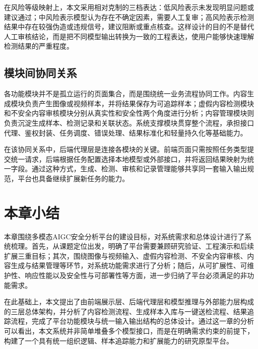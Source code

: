 在风险等级映射上，本文采用相对克制的三档表达：低风险表示未发现明显问题或建议通过；中风险表示模型认为存在不确定因素，需要人工复审；高风险表示检测结果中存在较强伪造或违规信号，建议阻断或重点核查。这样设计的目的不是替代人工审核结论，而是把不同模型输出转换为一致的工程表达，使用户能够快速理解检测结果的严重程度。

\subsection{模块间协同关系}

各功能模块并不是孤立运行的页面集合，而是围绕统一业务流程协同工作。内容生成模块负责产生图像或视频样本，并将结果保存为可追踪样本；虚假内容检测模块和不安全内容审核模块分别从真实性和安全性两个角度进行分析；内容管理模块则负责沉淀生成样本、检测记录和关联状态。系统支撑模块贯穿整个流程，承担接口代理、鉴权封装、任务调度、错误处理、结果标准化和轻量持久化等基础能力。

在该协同关系中，后端代理层是连接各模块的关键。前端页面只需按照任务类型提交统一请求，后端根据任务配置选择本地模型或外部接口，并将返回结果映射为统一字段。通过这种方式，生成、检测、审核和记录管理能够共享同一套输入输出规范，平台也具备继续扩展新任务的能力。

\section{本章小结}

本章围绕多模态AIGC安全分析平台的建设目标，对系统需求和总体设计进行了系统梳理。首先，从课题定位出发，明确了平台需要兼顾研究验证、工程演示和后续扩展三重目标；其次，围绕图像与视频输入、虚假内容检测、不安全内容审核、内容生成与结果管理等环节，对系统功能需求进行了分析；随后，从可扩展性、可维护性、响应性能以及安全性与可部署性等方面，进一步归纳了平台必须满足的非功能需求。

在此基础上，本文提出了由前端展示层、后端代理层和模型推理与外部能力层构成的三层总体架构，并分析了内容检测流程、生成样本入库与一键送检流程、结果追踪流程，完成了平台功能模块与统一输入输出结构的总体设计。通过这一章的分析可以看出，本文系统并非简单堆叠多个模型接口，而是在明确需求约束的前提下，构建了一个具有统一组织逻辑、样本追踪能力和扩展能力的研究原型平台。
